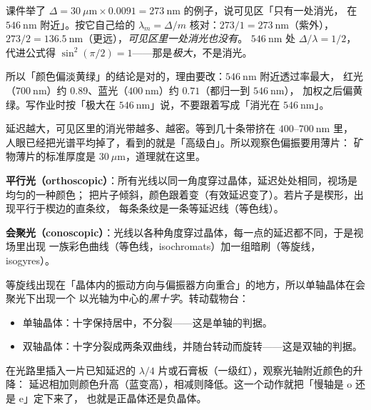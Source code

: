 \documentclass[11pt]{ctexart}
\let\subhdrtheme\subhdr
\renewcommand{\subhdr}[1]{\needspace{3\baselineskip}\subhdrtheme{#1}}
\let\hdrorig\hdr
\renewcommand{\hdr}[2]{\needspace{8\baselineskip}\hdrorig{#1}{#2}}
\begin{document}

课件举了 $\Delta=30\ \mu\mathrm{m}\times0.0091=273\ \mathrm{nm}$ 的例子，说可见区「只有一处消光，
在 $546\ \mathrm{nm}$ 附近」。按它自己给的 $\lambda_m=\Delta/m$ 核对：$273/1=273\ \mathrm{nm}$（紫外），
$273/2=136.5\ \mathrm{nm}$（更远），\emph{可见区里一处消光也没有}。
$546\ \mathrm{nm}$ 处 $\Delta/\lambda=1/2$，代进公式得 $\sin^2(\pi/2)=1$——那是\emph{极大}，不是消光。

所以「颜色偏淡黄绿」的结论是对的，理由要改：$546\ \mathrm{nm}$ 附近透过率最大，
红光（$700\ \mathrm{nm}$）约 $0.89$、蓝光（$400\ \mathrm{nm}$）约 $0.71$（都归一到 $546\ \mathrm{nm}$），
加权之后偏黄绿。写作业时按「极大在 $546\ \mathrm{nm}$」说，不要跟着写成「消光在 $546\ \mathrm{nm}$」。


延迟越大，可见区里的消光带越多、越密。等到几十条带挤在 $400$--$700\ \mathrm{nm}$ 里，
人眼已经把光谱平均掉了，看到的就是「高级白」。所以观察色偏振要用薄片：
矿物薄片的标准厚度是 $30\ \mu\mathrm{m}$，道理就在这里。



\textbf{平行光（orthoscopic）}：所有光线以同一角度穿过晶体，延迟处处相同，视场是均匀的一种颜色；
把片子倾斜，颜色跟着变（有效延迟变了）。若片子是楔形，出现平行于楔边的直条纹，
每条条纹是一条等延迟线（等色线）。

\textbf{会聚光（conoscopic）}：光线以各种角度穿过晶体，每一点的延迟都不同，于是视场里出现
一族彩色曲线（等色线，isochromats）加一组暗刷（等旋线，isogyres）。


等旋线出现在「晶体内的振动方向与偏振器方向重合」的地方，所以单轴晶体在会聚光下出现一个
以光轴为中心的\emph{黑十字}。转动载物台：

\begin{itemize}[leftmargin=1.8em]
\item 单轴晶体：十字保持居中，不分裂——这是单轴的判据。
\item 双轴晶体：十字分裂成两条双曲线，并随台转动而旋转——这是双轴的判据。
\end{itemize}


在光路里插入一片已知延迟的 $\lambda/4$ 片或石膏板（一级红），观察光轴附近颜色的升降：
延迟相加则颜色升高（蓝变高），相减则降低。这一个动作就把「慢轴是 o 还是 e」定下来了，
也就是正晶体还是负晶体。
\end{document}
